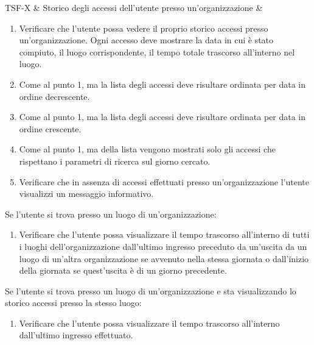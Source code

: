 TSF-X & Storico degli accessi dell'utente presso un'organizzazione & \begin{enumerate}
    \item Verificare che l'utente possa vedere il proprio storico accessi presso un'organizzazione. Ogni accesso deve mostrare la data in cui è stato compiuto, il luogo corrispondente, il tempo totale trascorso all'interno nel luogo.
    \item Come al punto 1, ma la lista degli accessi deve risultare ordinata per data in ordine decrescente.
    \item Come al punto 1, ma la lista degli accessi deve risultare ordinata per data in ordine crescente.
    \item Come al punto 1, ma della lista vengono mostrati solo gli accessi che rispettano i parametri di ricerca sul giorno cercato.
    \item Verificare che in assenza di accessi effettuati presso un'organizzazione l'utente visualizzi un messaggio informativo.
\end{enumerate}
Se l'utente si trova presso un luogo di un'organizzazione:
\begin{enumerate}
    \item Verificare che l'utente possa visualizzare il tempo trascorso all'interno di tutti i luoghi dell'organizzazione dall'ultimo ingresso preceduto da un'uscita da un luogo di un'altra organizzazione se avvenuto nella stessa giornata o dall'inizio della giornata se quest'uscita è di un giorno precedente. %
\end{enumerate}
Se l'utente si trova presso un luogo di un'organizzazione e sta visualizzando lo storico accessi presso la stesso luogo:
\begin{enumerate}
    \item Verificare che l'utente possa visualizzare il tempo trascorso all'interno dall'ultimo ingresso effettuato.
\end{enumerate} \\

